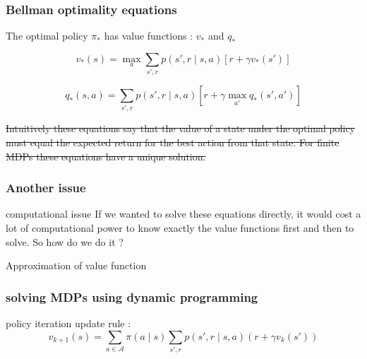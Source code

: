\documentclass[11pt]{beamer}
\begin{document}
\begin{frame}
\frametitle{Bellman optimality equations}

The optimal policy $\pi_{*}$ has value functions : $v_*$ and $q_*$

\begin{block}{}

\begin{equation}
v_{*}(s)=\max_{a} \sum_{s',r}p(s',r\mid s,a)[r+\gamma v_{*}(s')]
\label{bellman_opt_v}
\end{equation}

\begin{equation}
q_{*}(s,a)= \sum_{s',r}p(s',r \mid s,a)[r+\gamma \max_{a'}q_{*}(s',a')]
\label{bellman_opt_q}
\end{equation}
\end{block}

\sout{Intuitively these equations say that the value of a state under the optimal policy must equal the expected return for the best action from that state. For finite MDPs these equations have a unique solution.}
\end{frame}

\begin{frame}
\frametitle{Another issue}
\begin{alertblock}{computational issue}
If we wanted to solve these equations directly, it would cost a lot of computational power to know exactly the value functions first and then to solve. So how do we do it ? 
\end{alertblock}

\pause 
\vspace{1cm}
\centering
Approximation of value function

\end{frame}

\begin{frame}
\frametitle{solving MDPs using dynamic programming}
\begin{block}{policy iteration}
update rule : 
$$ v_{k+1}(s)=\sum_{a \in \mathcal{A}}\pi(a \mid s)\sum_{s',r}p(s',r\mid s,a)(r+\gamma v_k(s')) $$
\end{block}

\end{frame}

%
%    
\end{document}
